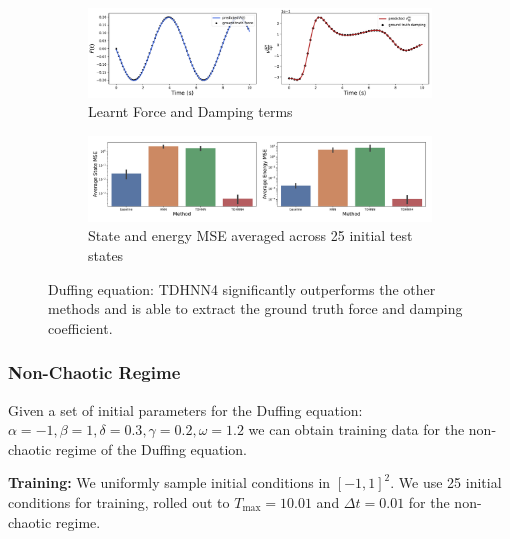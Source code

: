 \documentclass{article}
\begin{document}
\begin{figure}[h!]
\centering
\captionsetup{justification=centering}
	\begin{subfigure}[b]{0.48\textwidth}
		\centering
		\includegraphics[width=\textwidth]{figures/figures/duffing/1/duffing_dpdt_new_0.pdf}
		\caption{Learnt Force and Damping terms}
	\end{subfigure}
	\begin{subfigure}[b]{0.48\textwidth}
	    \centering
		\includegraphics[width=\textwidth]{figures/figures/duffing/1/duffing_errors_0.pdf}
		\caption{State and energy MSE averaged across 25 initial test states}
	\end{subfigure}
\caption{Duffing equation: TDHNN4 significantly outperforms the other methods and is able to extract the ground truth force and damping coefficient.}
\label{fig.duffing}
\end{figure}

\subsubsection{Non-Chaotic Regime}

Given a set of initial parameters for the Duffing equation: $\alpha =-1,\beta=1,\delta=0.3,\gamma=0.2,\omega=1.2$ we can obtain training data for the non-chaotic regime of the Duffing equation. 

\textbf{Training:} We uniformly sample initial conditions in $[-1,1]^2$. We use 25 initial conditions for training, rolled out to $T_{\max}=10.01$ and $\Delta t =0.01$ for the non-chaotic regime. 
\end{document}
